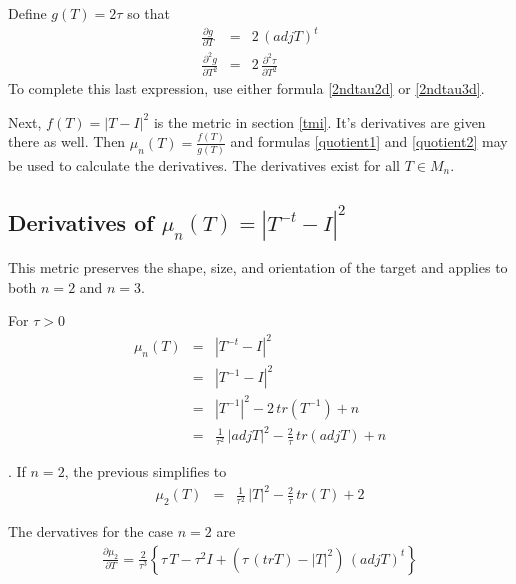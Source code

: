 \documentclass{report}
\begin{document}
\noindent Define $g(T)=2 \tau$ so that
\begin{eqnarray}
\frac{\partial g}{\partial T} & = & 2 \, (adj T)^t \\
\frac{\partial^2 g}{\partial T^2} & = & 2 \, \frac{\partial^2 \tau}{\partial T^2}
\end{eqnarray}
To complete this last expression, use either formula \ref{2ndtau2d} or \ref{2ndtau3d}. \newline

\noindent Next, $f(T)=|T-I|^2$ is the metric in section \ref{tmi}. It's
derivatives are given there as well. Then $\mu_n(T) = \frac{f(T)}{g(T)}$ 
and formulas \ref{quotient1} and \ref{quotient2} may be used to calculate the derivatives. 
The derivatives exist for all $T \in M_n$. \newline


\subsection{Derivatives of $\mu_n(T)=|T^{-t}-I|^2$}

\noindent This metric preserves the shape, size, and orientation of the target
and applies to both $n=2$ and $n=3$. \newline

\noindent For $\tau>0$
\begin{eqnarray}
\mu_n (T) & = & |T^{-t}-I|^2 \\
          & = & |T^{-1}-I|^2  \\
          & = & |T^{-1}|^2 - 2 \, tr(T^{-1}) + n \\
          & = & \frac{1}{\tau^2} \, |adj T|^2 - \frac{2}{\tau} \, tr(adj T) + n
\end{eqnarray}

. \newline
If $n=2$, the previous simplifies to
\begin{eqnarray}
\mu_2 (T) & = &  \frac{1}{\tau^2} \, |T|^2 - \frac{2}{\tau} \, tr(T) + 2
\end{eqnarray}

\noindent The dervatives for the case $n=2$ are
\begin{eqnarray}
\frac{\partial \mu_2}{\partial T} = \frac{2}{\tau^3} \left\{ \tau \, T - \tau^2 I + \left( \tau \, (tr T) - |T|^2 \right) \, (adj T)^t \right\}
\end{eqnarray}
\end{document}
